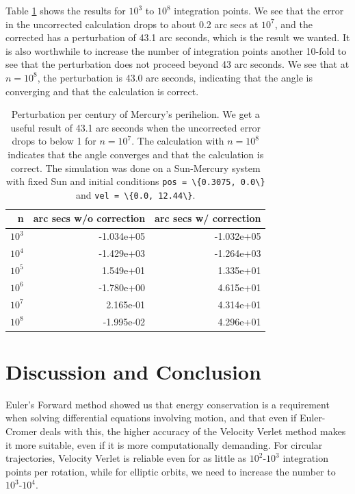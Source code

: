 \documentclass[]{article}
\begin{document}
Table \ref{tab:perihelion} shows the results for $10^3$ to $10^8$ integration points. We see that the error in the uncorrected calculation drops to about 0.2 arc secs at $10^7$, and the corrected has a perturbation of 43.1 arc seconds, which is the result we wanted. It is also worthwhile to increase the number of integration points another 10-fold to see that the perturbation does not proceed beyond 43 arc seconds. We see that at $n=10^8$, the perturbation is 43.0 arc seconds, indicating that the angle is converging and that the calculation is correct.

\begin{table}[!ht]
	\caption{Perturbation per century of Mercury's perihelion. We get a useful result of 43.1 arc seconds when the uncorrected error drops to below 1 for $n=10^7$. The calculation with $n=10^8$ indicates that the angle converges and that the calculation is correct. The simulation was done on a Sun-Mercury system with fixed Sun and initial conditions \lstinline|pos = \{0.3075, 0.0\}| and \lstinline|vel = \{0.0, 12.44\}|.}
	\label{tab:perihelion}
	\begin{center}
		\begin{tabular}{rrr}
			\toprule
			n &         arc secs w/o correction &          arc secs w/ correction \\
			\midrule
			$10^3$ & -1.034e+05 & -1.032e+05 \\
			$10^4$ & -1.429e+03 & -1.264e+03 \\
			$10^5$ &  1.549e+01 &  1.335e+01 \\
			$10^6$ & -1.780e+00 &  4.615e+01 \\
			$10^7$ &  2.165e-01 &  4.314e+01 \\
			$10^8$ & -1.995e-02 &  4.296e+01 \\
			\bottomrule
		\end{tabular}
	\end{center}
\end{table}


\section{Discussion and Conclusion} \label{conclusion}
Euler's Forward method showed us that energy conservation is a requirement when solving differential equations involving motion, and that even if Euler-Cromer deals with this, the higher accuracy of the Velocity Verlet method makes it more suitable, even if it is more computationally demanding. For circular trajectories, Velocity Verlet is reliable even for as little as $10^2$-$10^3$ integration points per rotation, while for elliptic orbits, we need to increase the number to $10^3$-$10^4$. 
\end{document}
